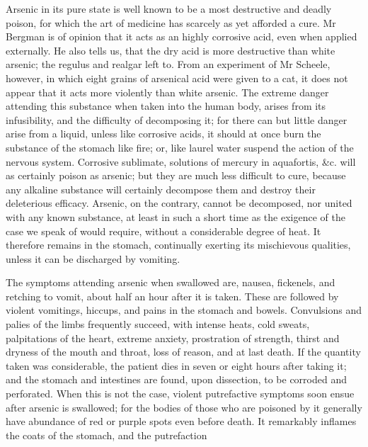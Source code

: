 \documentclass{article}
\begin{document}
Arsenic in its pure state is well known to be a most destructive and deadly poison, for which the art of medicine has scarcely as yet afforded a cure. Mr Bergman is of opinion that it acts as an highly corrosive acid, even when applied externally. He also tells us, that the dry acid is more destructive than white arsenic; the regulus and realgar left to. From an experiment of Mr Scheele, however, in which eight grains of arsenical acid were given to a cat, it does not appear that it acts more violently than white arsenic. The extreme danger attending this substance when taken into the human body, arises from its infusibility, and the difficulty of decomposing it; for there can but little danger arise from a liquid, unless like corrosive acids, it should at once burn the substance of the stomach like fire; or, like laurel water suspend the action of the nervous system. Corrosive sublimate, solutions of mercury in aquafortis, \&c. will as certainly poison as arsenic; but they are much less difficult to cure, because any alkaline substance will certainly decompose them and destroy their deleterious efficacy. Arsenic, on the contrary, cannot be decomposed, nor united with any known substance, at least in such a short time as the exigence of the case we speak of would require, without a considerable degree of heat. It therefore remains in the stomach, continually exerting its mischievous qualities, unless it can be discharged by vomiting.

The symptoms attending arsenic when swallowed are, nausea, fickenels, and retching to vomit, about half an hour after it is taken. These are followed by violent vomitings, hiccups, and pains in the stomach and bowels. Convulsions and palies of the limbs frequently succeed, with intense heats, cold sweats, palpitations of the heart, extreme anxiety, prostration of strength, thirst and dryness of the mouth and throat, loss of reason, and at last death. If the quantity taken was considerable, the patient dies in seven or eight hours after taking it; and the stomach and intestines are found, upon dissection, to be corroded and perforated. When this is not the case, violent putrefactive symptoms soon ensue after arsenic is swallowed; for the bodies of those who are poisoned by it generally have abundance of red or purple spots even before death. It remarkably inflames the coats of the stomach, and the putrefaction
\end{document}
